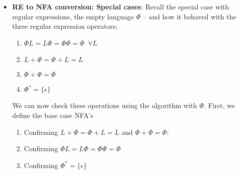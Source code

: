 \documentclass{report}
\begin{document}
\begin{itemize}
\item \textbf{RE to NFA conversion: Special cases}: Recall the special case with regular expressions, the empty language $\Phi$ – and how it behaved with the three regular expression operators;
    \begin{enumerate}
        \item $\Phi L  = L\Phi = \Phi\Phi = \Phi$\ $\forall L$
        \item $L + \Phi = \Phi + L = L $
        \item $\Phi + \Phi = \Phi $
        \item $\Phi^{*} = \{\epsilon\} $
    \end{enumerate}
    \bigbreak \noindent 
    \pagebreak \bigbreak \noindent 
    We can now check these operations using the algorithm with $\Phi $. First, we define the base case NFA's
    \bigbreak \noindent 
    \begin{figure}[ht]
        \centering
        \label{fig:base}
    \end{figure}
    \bigbreak \noindent 
    \begin{enumerate}
        \item Confirming $L+\Phi = \Phi+L= L$ and $\Phi+\Phi = \Phi$:
            \bigbreak \noindent 
            \begin{figure}[ht]
                \centering
                \label{fig:base2}
            \end{figure}
            \pagebreak 
        \item Confirming $\Phi L = L\Phi = \Phi\Phi = \Phi$
            \bigbreak \noindent 
            \begin{figure}[ht]
                \centering
                \label{fig:base6}
            \end{figure}
        \item Confirming $\Phi^{*} = \{\epsilon\}$
            \bigbreak \noindent 
            \begin{figure}[ht]
                \centering
                \label{fig:base7}
            \end{figure}
    \end{enumerate}


\end{itemize}
\end{document}
